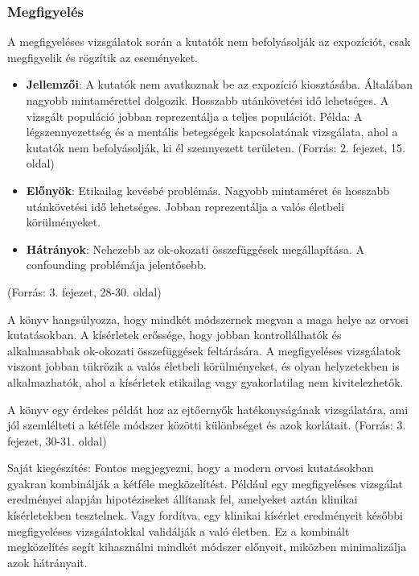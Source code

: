 \documentclass[a4paper,12pt]{article}
\begin{document}
    \subsubsection{Megfigyelés}

    A megfigyeléses vizsgálatok során a kutatók nem befolyásolják az expozíciót, csak megfigyelik és rögzítik az eseményeket.

    \begin{itemize}

        \item \textbf{Jellemzői}: A kutatók nem avatkoznak be az expozíció kiosztásába.
        Általában nagyobb mintamérettel dolgozik.
        Hosszabb utánkövetési idő lehetséges.
        A vizsgált populáció jobban reprezentálja a teljes populációt.
        Példa: A légszennyezettség és a mentális betegségek kapcsolatának vizsgálata, ahol a kutatók nem befolyásolják, ki él szennyezett területen. (Forrás: 2. fejezet, 15. oldal)

        \item  \textbf{Előnyök}: Etikailag kevésbé problémás.
        Nagyobb mintaméret és hosszabb utánkövetési idő lehetséges.
        Jobban reprezentálja a valós életbeli körülményeket.

        \item \textbf{Hátrányok}: Nehezebb az ok-okozati összefüggések megállapítása.
        A confounding problémája jelentősebb.
    \end{itemize}


    (Forrás: 3. fejezet, 28-30. oldal)

    A könyv hangsúlyozza, hogy mindkét módszernek megvan a maga helye az orvosi kutatásokban. A kísérletek erőssége, hogy jobban kontrollálhatók és alkalmasabbak ok-okozati összefüggések feltárására. A megfigyeléses vizsgálatok viszont jobban tükrözik a valós életbeli körülményeket, és olyan helyzetekben is alkalmazhatók, ahol a kísérletek etikailag vagy gyakorlatilag nem kivitelezhetők.

    A könyv egy érdekes példát hoz az ejtőernyők hatékonyságának vizsgálatára, ami jól szemlélteti a kétféle módszer közötti különbséget és azok korlátait. (Forrás: 3. fejezet, 30-31. oldal)

    Saját kiegészítés: Fontos megjegyezni, hogy a modern orvosi kutatásokban gyakran kombinálják a kétféle megközelítést. Például egy megfigyeléses vizsgálat eredményei alapján hipotéziseket állítanak fel, amelyeket aztán klinikai kísérletekben tesztelnek. Vagy fordítva, egy klinikai kísérlet eredményeit későbbi megfigyeléses vizsgálatokkal validálják a való életben. Ez a kombinált megközelítés segít kihasználni mindkét módszer előnyeit, miközben minimalizálja azok hátrányait.
\end{document}
